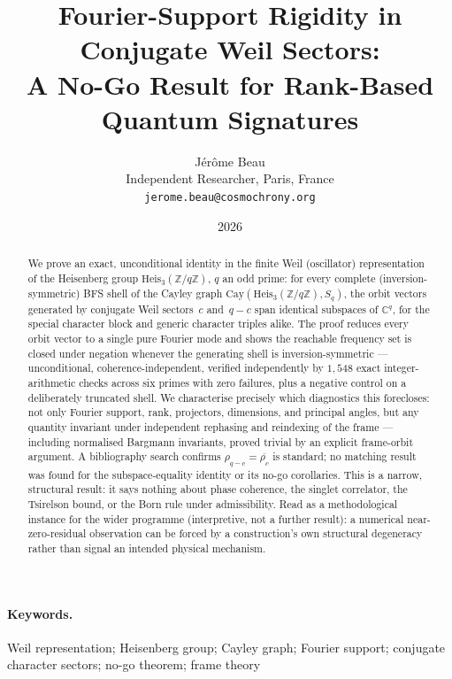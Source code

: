 \documentclass[11pt,a4paper]{article}
\title{Fourier-Support Rigidity in Conjugate Weil Sectors:\\
A No-Go Result for Rank-Based Quantum Signatures}
\author{J\'er\^ome Beau\\
\small Independent Researcher, Paris, France\\
\small \texttt{jerome.beau@cosmochrony.org}}
\date{2026}
\begin{document}
  \maketitle

  \begin{abstract}
    We prove an exact, unconditional identity in the finite Weil (oscillator) representation of the
    Heisenberg group $\mathrm{Heis}_3(\mathbb{Z}/q\mathbb{Z})$, $q$ an odd prime: for every complete
    (inversion-symmetric) BFS shell of the Cayley graph
    $\mathrm{Cay}(\mathrm{Heis}_3(\mathbb{Z}/q\mathbb{Z}), S_q)$, the orbit vectors generated by
    conjugate Weil sectors~$c$ and~$q-c$ span identical subspaces of $\mathbb{C}^q$, for the special
    character block and generic character triples alike. The proof reduces every orbit vector to a
    single pure Fourier mode and shows the reachable frequency set is closed under negation whenever
    the generating shell is inversion-symmetric --- unconditional, coherence-independent, verified
    independently by $1{,}548$ exact integer-arithmetic checks across six primes with zero failures,
    plus a negative control on a deliberately truncated shell. We characterise precisely which
    diagnostics this forecloses: not only Fourier support, rank, projectors, dimensions, and
    principal angles, but any quantity invariant under independent rephasing and reindexing of the
    frame --- including normalised Bargmann invariants, proved trivial by an explicit frame-orbit
    argument. A bibliography search confirms $\rho_{q-c}=\overline{\rho_c}$ is standard; no matching
    result was found for the subspace-equality identity or its no-go corollaries. This is a narrow,
    structural result: it says nothing about phase coherence, the singlet correlator, the Tsirelson
    bound, or the Born rule under admissibility. Read as a methodological instance for the wider
    programme (interpretive, not a further result): a numerical near-zero-residual observation can be
    forced by a construction's own structural degeneracy rather than signal an intended physical
    mechanism.
  \end{abstract}

  \paragraph{Keywords.}
    Weil representation; Heisenberg group; Cayley graph; Fourier support; conjugate character
    sectors; no-go theorem; frame theory

  \clearpage
  \tableofcontents
\end{document}
